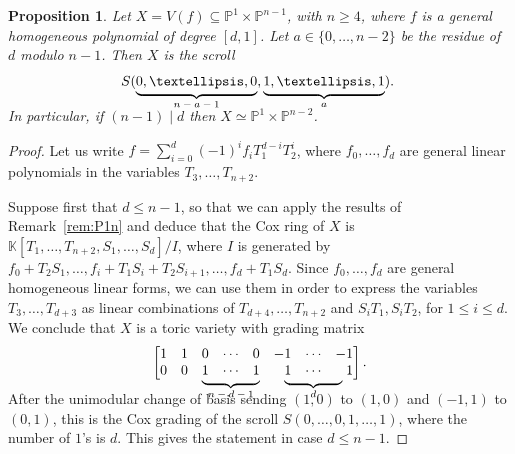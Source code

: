 \documentclass{amsart}
\newcommand\undermat[2]{%
  \makebox[0pt][l]{$\smash{\underbrace{\phantom{%
    \begin{matrix}#2\end{matrix}}}_{\text{$#1$}}}$}#2}
\newtheorem{proposition}[theorem]{Proposition}
\theoremstyle{definition}
\theoremstyle{remark}
\begin{document}
\begin{proposition}\label{prop:scroll}
Let $X = V(f) \subseteq {\mathbb P}^1\times
{\mathbb P}^{n-1}$, with $n\geq 4$, where $f$ is a general
homogeneous polynomial of degree $[d,1]$. Let
$a\in\{0,\dots,n-2\}$ be the residue of $d$ modulo $n-1$.
Then $X$ is the scroll
\[
    S(\undermat{n-a-1}{0,\dots,0},\undermat{a}{1,\dots,1}).\
\]

In particular, if $(n-1)\mid d$ then $X \simeq {\mathbb P}^1\times
    {\mathbb P}^{n-2}$.
\end{proposition}
\begin{proof}
Let us write $f = \sum_{i=0}^d (-1)^if_i
T_1^{d-i}T_2^i$, where $f_0,\dots,f_d$
are general linear polynomials in the
variables $T_3,\dots,T_{n+2}$.

Suppose first that $d\leq n-1$, so that we can apply
the results of Remark~\ref{rem:P1n} and deduce that
the Cox ring of $X$ is
$\mathbb K[T_1,\dots,T_{n+2},S_1,\dots,S_d]/I$,
where $I$ is generated by
$f_0+T_2S_1,\dots,f_i+T_1S_{i}+T_2S_{i+1},\dots,
f_d+T_1S_{d}$.
Since $f_0,\dots,f_d$ are general homogeneous linear forms,
we can use them in order to express the variables
$T_3,\dots,T_{d+3}$ as linear combinations of
$T_{d+4},\dots,T_{n+2}$ and $S_iT_1,S_iT_2$, for
$1\leq i\leq d$.
We conclude that $X$ is a toric variety
with grading matrix
\[
\begin{bmatrix*}[r]
  1 & 1 & 0 & \cdots & 0 & -1 & \cdots & -1 \\
  0 & 0 & \undermat{n-d-1}{1 & \cdots & 1} & \undermat{d}{1 & \cdots & 1}
\end{bmatrix*}.\\[10pt]
\]
After the unimodular change of basis sending $(1,0)$ to $(1,0)$ and $(-1,1)$ to $(0,1)$, this is the Cox grading of the scroll $S(0,\dots,0,1,\dots,1)$, where the number of $1$'s is $d$. This gives the statement in case $d\leq n-1$.


\end{proof}
\end{document}
